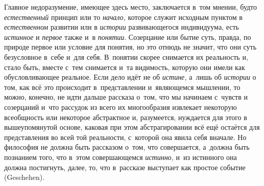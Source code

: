 Главное недоразумение, имеющее здесь место, заключается в~том
мнении, будто {\em естественный} принцип или то {\em начало,} которое
служит исходным пунктом в {\em естественном} развитии или в {\em истории}
развивающегося индивидуума, есть {\em истинное} и {\em первое} также и~в
{\em понятии}. Созерцание
или бытие суть, правда, по природе первое или условие для понятия, но это
отнюдь не значит, что они суть безусловное в~себе и~для себя. В~понятии
скорее снимается их реальность и, стало быть, вместе с~тем снимается и~та
видимость, которую они имели как обусловливающее реальное. Если дело идёт
не об {\em истине,} а~лишь об {\em истории} о
том, как всё это происходит в~представлении и~являющемся мышлении, то
можно, конечно, не идти дальше рассказа о~том, что мы начинаем с~чувств и
созерцаний и~что рассудок из всего их многообразия извлекает некоторую
всеобщность или некоторое абстрактное и, разумеется, нуждается для этого в
вышеупомянутой основе, каковая при этом абстрагировании всё ещё остаётся
для представления во всей той реальности, с~которой она явила себя вначале.
Но философия не должна быть рассказом о~том, что совершается, а~должна быть
познанием того, что в~этом совершающемся {\em истинно,} и~из
истинного она должна постигнуть, далее, то, что в~рассказе выступает как
простое событие (Geschehen).

